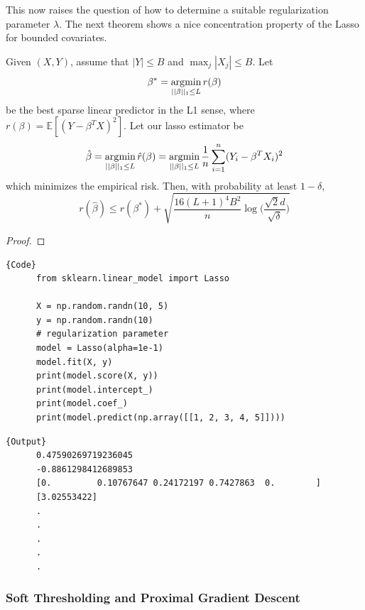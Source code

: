   This now raises the question of how to determine a suitable regularization parameter $\lambda$. The next theorem shows a nice concentration property of the Lasso for bounded covariates. 

  \begin{theorem}
    Given $(X, Y)$, assume that $|Y| \leq B$ and $\max_j |X_j| \leq B$. Let 
    \begin{equation}
      \beta^\ast = \operatorname*{\arg\!\min}_{||\beta||_1 \leq L} r(\beta)
    \end{equation}
    be the best sparse linear predictor in the L1 sense, where $r(\beta) = \mathbb{E}[ (Y - \beta^T X)^2]$. Let our lasso estimator be 
    \begin{equation}
      \hat{\beta} = \operatorname*{\arg\!\min}_{||\beta||_1 \leq L} \hat{r}(\beta) = \operatorname*{\arg\!\min}_{||\beta||_1 \leq L} \frac{1}{n} \sum_{i=1}^n (Y_i - \beta^T X_i)^2
    \end{equation}
    which minimizes the empirical risk. Then, with probability at least $1 - \delta$, 
    \begin{equation}
      r(\hat{\beta}) \leq r(\beta^\ast) + \sqrt{\frac{16(L+1)^4 B^2}{n} \log \bigg( \frac{\sqrt{2} d}{\sqrt{\delta}} \bigg)} 
    \end{equation}
  \end{theorem}
  \begin{proof}
    
  \end{proof}

  \begin{code}
    \noindent\begin{minipage}{.6\textwidth}
    \begin{lstlisting}[]{Code}
      from sklearn.linear_model import Lasso

      X = np.random.randn(10, 5) 
      y = np.random.randn(10)
      # regularization parameter
      model = Lasso(alpha=1e-1)  
      model.fit(X, y) 
      print(model.score(X, y))  
      print(model.intercept_)
      print(model.coef_) 
      print(model.predict(np.array([[1, 2, 3, 4, 5]]))) 
    \end{lstlisting}
    \end{minipage}
    \hfill
    \begin{minipage}{.39\textwidth}
    \begin{lstlisting}[]{Output}
      0.47590269719236045
      -0.8861298412689853
      [0.         0.10767647 0.24172197 0.7427863  0.        ]
      [3.02553422]
      .
      .
      .
      .
      .
    \end{lstlisting}
    \end{minipage}
  \end{code}

  \subsubsection{Soft Thresholding and Proximal Gradient Descent} 

